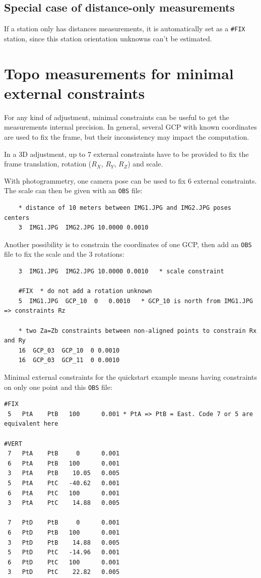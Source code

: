 \subsection{Special case of distance-only measurements}

If a station only has distances measurements, it is automatically
set as a \texttt{\#FIX} station, since this station orientation unknowns
can't be estimated.


\section{Topo measurements for minimal external constraints}

For any kind of adjustment, minimal constraints can be useful to get the measurements internal precision.
In general, several GCP with known coordinates are used to fix the frame, but their inconsistency may
impact the computation.

In a 3D adjustment, up to 7 external constraints have to be provided to fix the frame translation, rotation ($R_X$, $R_Y$, $R_Z$) and scale.

With photogrammetry, one camera pose can be used to fix 6 external constraints. The scale can then be given with an \texttt{OBS} file:
\begin{verbatim}
    * distance of 10 meters between IMG1.JPG and IMG2.JPG poses centers
    3  IMG1.JPG  IMG2.JPG 10.0000 0.0010   
\end{verbatim}

Another possibility is to constrain the coordinates of one GCP, then add an \texttt{OBS} file to fix the scale and the 3 rotations:
\begin{verbatim}
    3  IMG1.JPG  IMG2.JPG 10.0000 0.0010   * scale constraint

    #FIX  * do not add a rotation unknown
    5  IMG1.JPG  GCP_10  0   0.0010   * GCP_10 is north from IMG1.JPG => constraints Rz

    * two Za=Zb constraints between non-aligned points to constrain Rx and Ry
    16  GCP_03  GCP_10  0 0.0010
    16  GCP_03  GCP_11  0 0.0010
\end{verbatim}

Minimal external constraints for the quickstart example means having constraints on only one point and this \texttt{OBS} file:

\begin{verbatim}
#FIX
 5   PtA    PtB   100      0.001 * PtA => PtB = East. Code 7 or 5 are equivalent here
 
#VERT
 7   PtA    PtB     0      0.001
 6   PtA    PtB   100      0.001
 3   PtA    PtB    10.05   0.005
 5   PtA    PtC   -40.62   0.001
 6   PtA    PtC   100      0.001
 3   PtA    PtC    14.88   0.005

 7   PtD    PtB     0      0.001
 6   PtD    PtB   100      0.001
 3   PtD    PtB    14.88   0.005
 5   PtD    PtC   -14.96   0.001
 6   PtD    PtC   100      0.001
 3   PtD    PtC    22.82   0.005
\end{verbatim}


